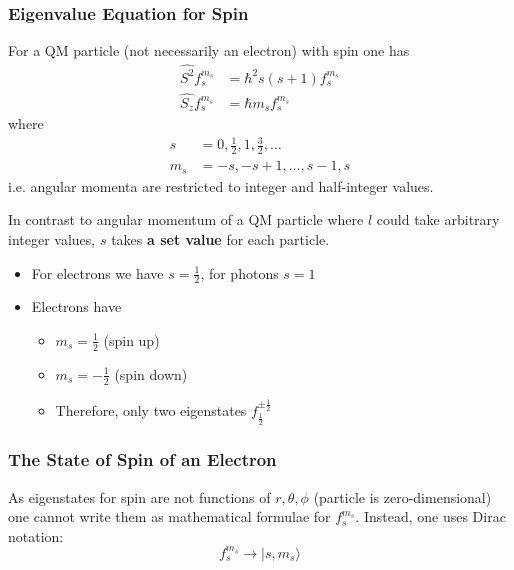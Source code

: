 \subsubsection{Eigenvalue Equation for Spin}
For a QM particle (not necessarily an electron) with spin one has
\begin{align*}
    \widehat{S^2}f_{s}^{m_s}   & =\hbar^{2}s (s+1) f_{s}^{m_s} \\
    \widehat{S_{z}}f_{s}^{m_s} & =\hbar m_sf_{s}^{m_s}
\end{align*}
where
\begin{align*}
    s   & =0,\frac{1}{2},1,\frac{3}{2},\dots \\
    m_s & =-s, -s+1,\dots, s-1, s
\end{align*}
i.e. angular momenta are restricted to integer and half-integer values.


In contrast to angular momentum of a QM particle where $l$ could take arbitrary integer values, $s$ takes \textbf{a set value} for each particle.


\begin{itemize}
    \item For electrons we have $s=\frac{1}{2}$, for photons $s=1$
    \item Electrons have
          \begin{itemize}
              \item $m_s=\frac{1}{2}$ (spin up)
              \item $m_s=-\frac{1}{2}$ (spin down)
              \item Therefore, only two eigenstates $f_{\frac{1}{2}}^{\pm \frac{1}{2}}$
          \end{itemize}
\end{itemize}

\subsubsection{The State of Spin of an Electron}
As eigenstates for spin are not functions of $r,\theta, \phi$ (particle is zero-dimensional) one cannot write them as mathematical formulae for $f_{s}^{m_s}$. Instead, one uses Dirac notation:
\begin{equation*}
    f_{s}^{m_{s}}\rightarrow|s,m_{s}\rangle
\end{equation*}


